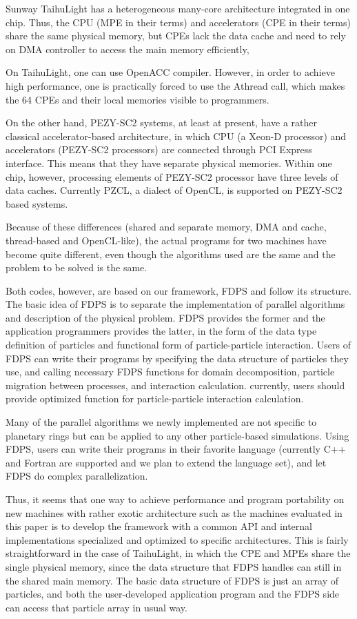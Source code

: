 \documentclass[conference]{IEEEtran}
\begin{document}
Sunway TaihuLight has a heterogeneous
many-core architecture integrated in one chip. Thus, the CPU (MPE in
their terms) and accelerators (CPE in their terms) share the same
physical memory, but CPEs lack the data cache and need to rely on DMA
controller to access the main memory efficiently,

On TaihuLight, one can use OpenACC compiler. However, in order to
achieve high performance, one is practically forced to use the Athread
call, which makes the 64 CPEs and their local memories  visible to
programmers.



On the other hand, PEZY-SC2 systems, at least at present, have a
rather classical accelerator-based architecture, in which CPU (a
Xeon-D processor) and accelerators (PEZY-SC2 processors) are connected
through PCI Express interface. This means that they have separate
physical memories. Within one chip, however, processing elements of
PEZY-SC2 processor have three levels of data caches. Currently PZCL, a
dialect of OpenCL, is supported on PEZY-SC2 based systems.

Because of these differences (shared and separate memory, DMA and
cache, thread-based and OpenCL-like), the actual programs for two
machines have become quite different, even though the algorithms used
are the same and the problem to be solved is the same.

Both codes, however, are based on our framework,
FDPS\cite{Iwasawaetal2016} and follow its structure. The basic idea of
FDPS is to separate the implementation of parallel algorithms and
description of the physical problem. FDPS provides the former and the
application programmers provides the latter, in the form of the data
type definition of particles and functional form of particle-particle
interaction. Users of FDPS can write their programs by specifying the
data structure of particles they use, and calling necessary FDPS
functions for domain decomposition, particle migration between
processes, and interaction calculation. currently, users should
provide optimized function for particle-particle interaction
calculation. 

Many of the parallel algorithms we newly implemented are
not specific to planetary rings but can be applied to any other
particle-based simulations. Using FDPS, users can write their programs
in their favorite language (currently C++ and Fortran are supported
and we plan to extend the language set), and let FDPS do complex
parallelization.

Thus, it seems that one way to achieve performance and program
portability on new machines with rather exotic architecture such as
the machines evaluated in this paper is to develop the framework with
a common API and internal implementations specialized and optimized to
specific architectures. This is fairly straightforward in the case of
TaihuLight, in which the CPE and MPEs share the single physical
memory, since the data structure that FDPS handles can still in the
shared main memory. The basic data structure of FDPS is just an array of
particles, and both the user-developed  application program and the FDPS
side can access that particle array in usual way. 
\end{document}
